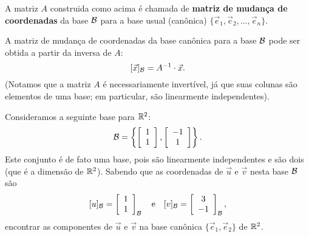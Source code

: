 \documentclass[../livro.tex]{subfiles}  %
\begin{document}
A matriz $A$ construida como acima é chamada de \textbf{matriz de mudança de coordenadas} da base $\mathcal{B}$ para a base usual (canônica) $\{ \vec{e}_1, \vec{e}_2, \dots, \vec{e}_n\}$.

A matriz de mudança de coordenadas da base canônica para a base $\mathcal{B}$ pode ser obtida a partir da inversa de $A$:
\[
[\vec{x}]_{\mathcal{B}} = A^{-1} \cdot \vec{x}.
\] (Notamos que a matriz $A$ é necessariamente invertível, já que suas colunas são elementos de uma base; em particular, são linearmente independentes).

\begin{example}
	Consideramos a seguinte base para $\mathbb{R}^2$:
	\[
	\mathcal{B} = \left\{ 
	\left[
	\begin{array}{c}
	1 \\
	1 \\
	\end{array}
	\right],
	\left[
	\begin{array}{c}
	-1 \\
	1 \\
	\end{array}
	\right]
	\right\}.
	\] Este conjunto é de fato uma base, pois são linearmente independentes e são dois (que é a dimensão de $\mathbb{R}^2$). Sabendo que as coordenadas de $\vec{u}$ e $\vec{v}$ nesta base $\mathcal{B}$ são
	\[
	[u]_{\mathcal{B}} = 
	\left[
	\begin{array}{c}
	1 \\
	1 \\
	\end{array}
	\right]_{\mathcal{B}} \quad \text{e} \quad 
	[v]_{\mathcal{B}} =
	\left[
	\begin{array}{c}
	3 \\
	-1 \\
	\end{array}
	\right]_{\mathcal{B}},
	\] encontrar as componentes de $\vec{u}$ e $\vec{v}$ na base canônica $\{ \vec{e}_1, \vec{e}_2\}$ de $\mathbb{R}^2$.
	

\end{example}
\end{document}
